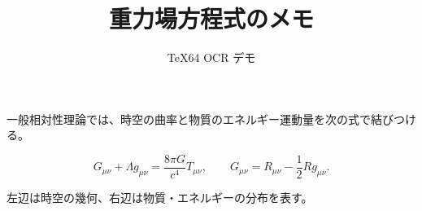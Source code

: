\documentclass[a4paper,11pt]{ltjsarticle}
\title{重力場方程式のメモ}
\author{TeX64 OCR デモ}
\date{}
\begin{document}
\maketitle

一般相対性理論では、時空の曲率と物質のエネルギー運動量を次の式で結びつける。

\[
G_{\mu\nu}+\Lambda g_{\mu\nu}
=\frac{8\pi G}{c^4}T_{\mu\nu},
\qquad
G_{\mu\nu}=R_{\mu\nu}-\frac{1}{2}Rg_{\mu\nu}.
\]

左辺は時空の幾何、右辺は物質・エネルギーの分布を表す。
\end{document}
